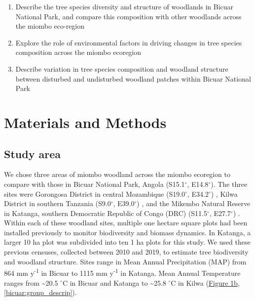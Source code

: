 \begin{refsection}
\begin{enumerate}
\item{Describe the tree species diversity and structure of woodlands in Bicuar National Park, and compare this composition with other woodlands across the miombo eco-region}
\item{Explore the role of environmental factors in driving changes in tree species composition across the miombo ecoregion}
\item{Describe variation in tree species composition and woodland structure between disturbed and undisturbed woodland patches within Bicuar National Park}
\end{enumerate}

\section{Materials and Methods}
\label{bicuar:sec:methods}

\subsection{Study area}
\label{bicuar:ssec:plot_loc}

We chose three areas of miombo woodland across the miombo ecoregion to compare with those in Bicuar National Park, Angola (S15.1$^\circ$, E14.8$^\circ$). The three sites were Gorongosa District in central Mozambique (S19.0$^\circ$, E34.2$^\circ$) \citep{Ryan2011}, Kilwa District in southern Tanzania (S9.0$^\circ$, E39.0$^\circ$) \citep{McNicol2018a}, and the Mikembo Natural Reserve in Katanga, southern Democratic Republic of Congo (DRC) (S11.5$^\circ$, E27.7$^\circ$) \citep{Muledi2017}. Within each of these woodland sites, multiple one hectare square plots had been installed previously to monitor biodiversity and biomass dynamics. In Katanga, a larger 10 ha plot was subdivided into ten 1 ha plots for this study. We used these previous censuses, collected between 2010 and 2019, to estimate tree biodiversity and woodland structure. Sites range in Mean Annual Precipitation (MAP) from 864 mm y\textsuperscript{-1} in Bicuar to 1115 mm y\textsuperscript{-1} in Katanga. Mean Annual Temperature ranges from \textasciitilde{}20.5 $^\circ$C in Bicuar and Katanga to \textasciitilde{}25.8 $^\circ$C in Kilwa (\hyperref[temp_precip]{Figure 1b}, \autoref{bicuar:group_descrip}).


\end{refsection}
